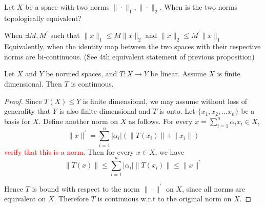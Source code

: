 \begin{note}
  Let $X$ be a space with two norms $\|\cdot\|_1, \|\cdot\|_2$. When is the two norms topologically equivalent?

  When $\exists M, M^\prime$ such that $\|x\|_1 \le M \|x\|_2$ and $\|x\|_2 \le M^\prime \|x\|_1$
    Equivalently, when the identity map between the two spaces with their respective norms are bi-continuous. (See 4th equivalent statement of previous proposition)
\end{note}
\begin{theorem}
  Let $X$ and $Y$ be normed spaces, and $T: X \to Y$ be linear. Assume $X$ is finite dimensional. Then $T$ is continuous.
\end{theorem}
\begin{proof}
  Since $T(X) \le Y$ is finite dimensional, we may assume without loss of generality that $Y$ is also finite dimensional and $T$ is onto. Let $\{ x_1, x_2, \ldots x_n \}$ be a basis for $X$. Define another norm on $X$ as follows. For every $x  = \sum_{i = 1}^{n} \alpha_i x_i \in X$, \[
    \|x\|^\prime = \sum_{i = 1}^{n} |\alpha_i| (\|T(x_i)\| + \|x_i\|)
  \]
  \textcolor{red}{verify that this is a norm}. Then for every $x \in X$, we have \[
    \|T(x)\| \le \sum_{i = 1}^{n} |\alpha_i|\|T(x_i)\| \le \|x\|^\prime
  \]

  Hence $T$ is bound with respect to the norm $\|\cdot\|^\prime$ on $X$, since all norms are equivalent on $X$. Therefore $T$ is continuous w.r.t to the original norm on $X$.
\end{proof}

